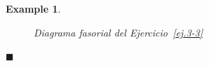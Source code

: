 \documentclass[11pt]{book} %
\makeatletter
\numberwithin{dummy}{section}
\theoremstyle{ocrenumbox}
\theoremstyle{blacknumex}
\newtheorem{exampleT}{Example}[chapter]
\theoremstyle{blacknumbox}
\theoremstyle{ocrenum}
\newenvironment{example}{\begin{exampleT}}{\hfill{\tiny\ensuremath{\blacksquare}}\end{exampleT}}
\renewcommand{\section}{\@startsection{section}{1}{\z@}
{-4ex \@plus -1ex \@minus -.4ex}
{1ex \@plus.2ex }
{\normalfont\large\sffamily\bfseries}}
\makeatother
\begin{document}
\begin{example}
\begin{figure}
	        \caption{Diagrama fasorial del Ejercicio~\ref{ej.3-3}}
	       \label{fig.diagrama_ejemplo_3-3}
	    \end{figure}
	\end{example}
	
	
	
	
\end{document}
